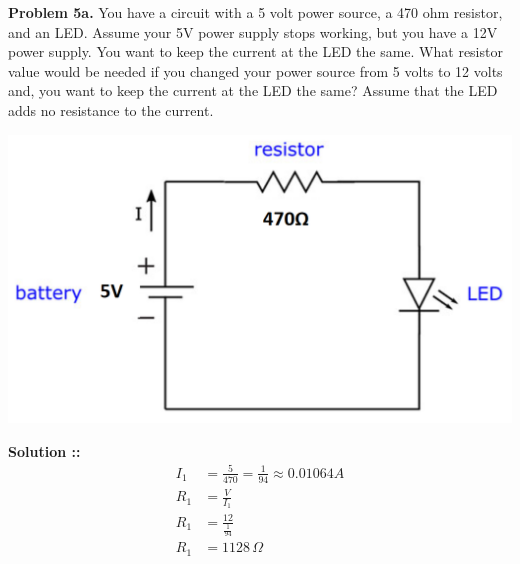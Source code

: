 \documentclass[11pt]{article}
\begin{document}
\textbf{Problem 5a.} You have a circuit with a 5 volt power source, a 470 ohm
resistor, and an LED. Assume your 5V power supply stops working, but you have
a 12V power supply. You want to keep the current at the LED the same. What
resistor value would be needed if you changed your power source from 5 volts to
12 volts and, you want to keep the current at the LED the same? Assume that
the LED adds no resistance to the current.
\begin{center}
    \includegraphics[scale=0.2]{5a.png}
\end{center}
\vspace{5px}\textbf{Solution ::} 
\begin{align}
    I_1 &= \frac{5}{470} = \frac{1}{94} \approx 0.01064A \\
    R_1 &= \frac{V}{I_1}\\
    R_1 &= \frac{12}{\frac{1}{94}} \\
    R_1 &= 1128\,\Omega
\end{align}


\pagebreak

\end{document}
